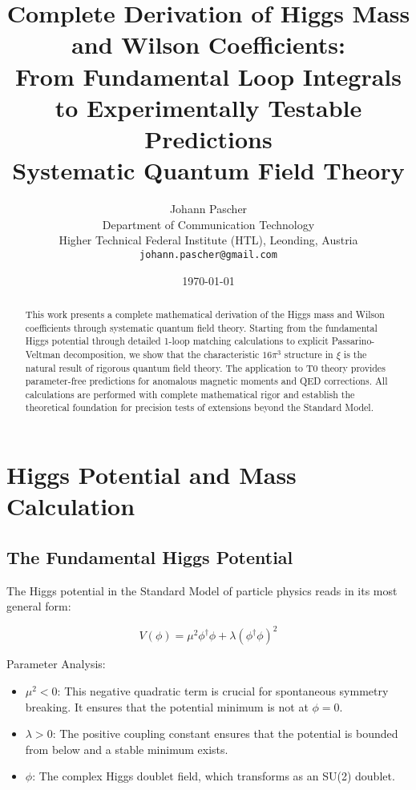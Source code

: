 \documentclass[12pt,a4paper]{article}
\title{Complete Derivation of Higgs Mass and Wilson Coefficients:\\From Fundamental Loop Integrals to Experimentally Testable Predictions\\
	\large Systematic Quantum Field Theory}
\author{Johann Pascher\\
	Department of Communication Technology\\
	Higher Technical Federal Institute (HTL), Leonding, Austria\\
	\texttt{johann.pascher@gmail.com}}
\date{\today}
\theoremstyle{definition}
\begin{document}
	
	\maketitle
	
	\begin{abstract}
		This work presents a complete mathematical derivation of the Higgs mass and Wilson coefficients through systematic quantum field theory. Starting from the fundamental Higgs potential through detailed 1-loop matching calculations to explicit Passarino-Veltman decomposition, we show that the characteristic $16\pi^3$ structure in $\xi$ is the natural result of rigorous quantum field theory. The application to T0 theory provides parameter-free predictions for anomalous magnetic moments and QED corrections. All calculations are performed with complete mathematical rigor and establish the theoretical foundation for precision tests of extensions beyond the Standard Model.
	\end{abstract}
	
	\tableofcontents
	\newpage
	
	\section{Higgs Potential and Mass Calculation}
	
	\subsection{The Fundamental Higgs Potential}
	
	The Higgs potential in the Standard Model of particle physics reads in its most general form:
	
	\begin{equation}
		V(\phi) = \mu^2 \phi^\dagger\phi + \lambda(\phi^\dagger\phi)^2
	\end{equation}
	
	\begin{important}
		Parameter Analysis:
		\begin{itemize}
			\item $\mu^2 < 0$: This negative quadratic term is crucial for spontaneous symmetry breaking. It ensures that the potential minimum is not at $\phi = 0$.
			\item $\lambda > 0$: The positive coupling constant ensures that the potential is bounded from below and a stable minimum exists.
			\item $\phi$: The complex Higgs doublet field, which transforms as an SU(2) doublet.
		\end{itemize}
	\end{important}
	
\end{document}
